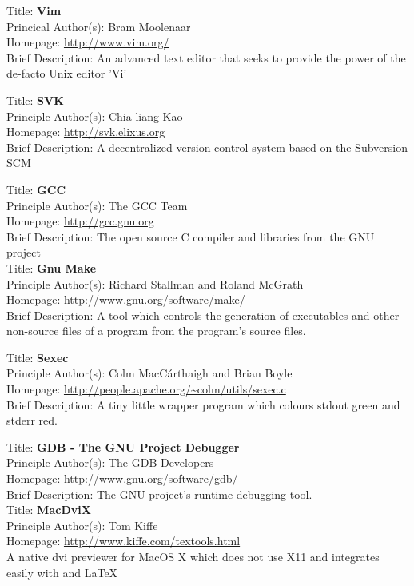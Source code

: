 
Title: 	\textbf{Vim}	\\
Princical Author(s): 	Bram Moolenaar	\\
Homepage: 	\url{http://www.vim.org/}	\\	
Brief Description: 		An advanced text editor that seeks to provide the power of the 
de-facto Unix editor 'Vi'


Title:		\textbf{SVK}	\\
Principle Author(s): 	Chia-liang Kao	\\
Homepage:		\url{http://svk.elixus.org}	\\
Brief Description:		A decentralized version control system based on the Subversion
SCM


Title:		\textbf{GCC}	\\	
Principle Author(s): 	The GCC Team	\\
Homepage:		\url{http://gcc.gnu.org}	\\
Brief Description:		The open source C compiler and libraries from the GNU project \\


Title:		\textbf{Gnu Make}	\\
Principle Author(s): 	Richard Stallman and Roland McGrath	\\
Homepage:		\url{http://www.gnu.org/software/make/} \\
Brief Description:		A tool which controls the generation of executables and other
non-source files of a program from the program's source files.


Title: 		\textbf{Sexec}	\\
Principle Author(s): 	Colm MacC\'{a}rthaigh and Brian Boyle	\\
Homepage:		\url{http://people.apache.org/~colm/utils/sexec.c} \\
Brief Description:		A tiny little wrapper program which colours stdout green 
and stderr red.


Title:		\textbf{GDB - The GNU Project Debugger}	\\	
Principle Author(s): 	The GDB Developers	\\
Homepage:		\url{http://www.gnu.org/software/gdb/}	\\
Brief Description: The GNU project's runtime debugging tool. \\


Title:		\textbf{MacDviX}	\\	
Principle Author(s): 	Tom Kiffe \\
Homepage:		\url{http://www.kiffe.com/textools.html}	\\
A native dvi previewer for MacOS X which does not use X11 and 
integrates easily with \Tex{} and \LaTeX{} \\


